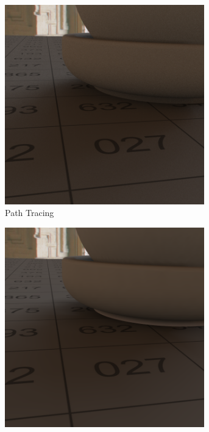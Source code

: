 	\begin{figure}[h]
		\begin{subfigure}[t]{0.33\textwidth}
			\center
			\includegraphics[width=0.95\textwidth]{pic/irrmap-shaderball_e4-ref.png}
			\caption{Path Tracing}
		\end{subfigure}
		\begin{subfigure}[t]{0.33\textwidth}
			\center
			\includegraphics[width=0.95\textwidth]{pic/irrmap-shaderball_e4-vmap.png}

\end{subfigure}
\end{figure}
